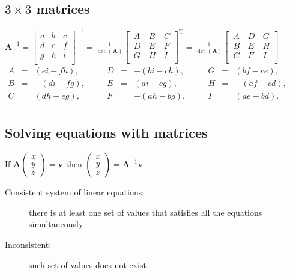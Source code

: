 \subsection{$3\times3$ matrices}
$\mathbf {A} ^{-1}={\begin{bmatrix}a&b&c\\d&e&f\\g&h&i\\\end{bmatrix}}^{-1}={\frac {1}{\det(\mathbf {A} )}}{\begin{bmatrix}\,A&\,B&\,C\\\,D&\,E&\,F\\\,G&\,H&\,I\\\end{bmatrix}}^{\mathrm {T} }={\frac {1}{\det(\mathbf {A} )}}{\begin{bmatrix}\,A&\,D&\,G\\\,B&\,E&\,H\\\,C&\,F&\,I\\\end{bmatrix}}$\\
$\begin{alignedat}{6}A&={}&(ei-fh),&\quad &D&={}&-(bi-ch),&\quad &G&={}&(bf-ce),\\B&={}&-(di-fg),&\quad &E&={}&(ai-cg),&\quad &H&={}&-(af-cd),\\C&={}&(dh-eg),&\quad &F&={}&-(ah-bg),&\quad &I&={}&(ae-bd).\\\end{alignedat}$

\subsection{Solving equations with matrices}
If $\mathbf{A}\begin{pmatrix}
	x\\y\\z
\end{pmatrix}=\mathbf{v}$ then $\begin{pmatrix}
	x\\y\\z
\end{pmatrix}=\mathbf{A}^{-1}\mathbf{v}$
\begin{description}
	\item[Consistent system of linear equations:] there is at least one set of values that satisfies all the equations simultaneously
	\item[Inconsistent:] such set of values does not exist
\end{description}

